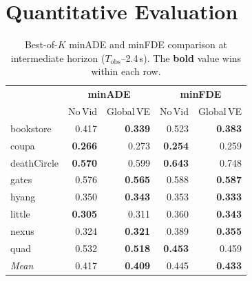 \documentclass[11pt,a4paper]{article}
\begin{document}
\section{Quantitative Evaluation}
\label{sec:results}

\begin{table}[ht]
\centering
\caption{Best-of-$K$ minADE and minFDE comparison at intermediate horizon ($T_{\mathrm{obs}}$--2.4\,s).  The \textbf{bold} value wins within each row.}
\label{tab:mid}
\small
\begin{tabular}{@{}l r r r r@{}}
\toprule
 & \multicolumn{2}{c}{\textbf{minADE}} & \multicolumn{2}{c}{\textbf{minFDE}} \\
 & \multicolumn{1}{c}{No\,Vid} & \multicolumn{1}{c}{Global\,VE} & \multicolumn{1}{c}{No\,Vid} & \multicolumn{1}{c}{Global\,VE} \\
\midrule
bookstore     & 0.417 & \textbf{0.339} & 0.523 & \textbf{0.383} \\
coupa         & \textbf{0.266} & 0.273 & \textbf{0.254} & 0.259 \\
deathCircle   & \textbf{0.570} & 0.599 & \textbf{0.643} & 0.748 \\
gates         & 0.576 & \textbf{0.565} & 0.588 & \textbf{0.587} \\
hyang         & 0.350 & \textbf{0.343} & 0.353 & \textbf{0.333} \\
little        & \textbf{0.305} & 0.311 & 0.360 & \textbf{0.343} \\
nexus         & 0.324 & \textbf{0.321} & 0.389 & \textbf{0.355} \\
quad          & 0.532 & \textbf{0.518} & \textbf{0.453} & 0.459 \\
\midrule
\textit{Mean} & 0.417 & \textbf{0.409} & 0.445 & \textbf{0.433} \\
\bottomrule
\end{tabular}
\end{table}
\end{document}
